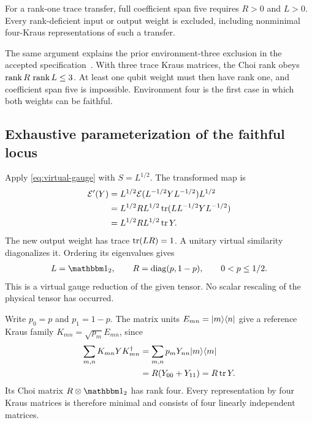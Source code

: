 \begin{proposition}
	\label{prop:faithful}
	For a rank-one trace transfer, full coefficient span five requires
	$R>0$ and $L>0$. Every rank-deficient input or output weight is
	excluded, including nonminimal four-Kraus representations of such
	a transfer.
\end{proposition}

The same argument explains the prior environment-three exclusion
in the accepted specification~\cite{Targets}. With three trace
Kraus matrices, the Choi rank obeys
$\operatorname{rank} R\,\operatorname{rank} L\leq3$. At least one qubit weight must then have
rank one, and coefficient span five is impossible. Environment four
is the first case in which both weights can be faithful.

\subsection{Exhaustive parameterization of the faithful locus}

Apply \cref{eq:virtual-gauge} with $S=L^{1/2}$. The transformed map is
\begin{align}
	\mathcal{E}'(Y)
	 & =L^{1/2}\mathcal{E}(L^{-1/2}YL^{-1/2})L^{1/2}
	\nonumber                                  \\
	 & =L^{1/2}RL^{1/2}
	\operatorname{tr}(LL^{-1/2}YL^{-1/2})
	\nonumber                                  \\
	 & =L^{1/2}RL^{1/2}\operatorname{tr} Y.
	\label{eq:whitening}
\end{align}
The new output weight has trace $\operatorname{tr}(LR)=1$. A unitary virtual
similarity diagonalizes it. Ordering its eigenvalues gives
\begin{align}
	L=\Id_2,\qquad
	R=\diag(p,1-p),\qquad
	0<p\leq1/2.
	\label{eq:normal-form}
\end{align}
This is a virtual gauge reduction of the given tensor. No scalar
rescaling of the physical tensor has occurred.

Write $p_0=p$ and $p_1=1-p$. The matrix units
$E_{mn}=\lvert m\rangle\langle n\rvert$ give a reference Kraus family
$K_{mn}=\sqrt{p_m}E_{mn}$, since
\begin{align}
	\sum_{m,n}K_{mn}YK_{mn}^\dagger
	 & =\sum_{m,n}p_mY_{nn}\lvert m\rangle\langle m\rvert
	\nonumber                           \\
	 & =R(Y_{00}+Y_{11})=R\operatorname{tr} Y.
	\label{eq:reference-kraus}
\end{align}
Its Choi matrix $R\otimes\Id_2$ has rank four. Every representation
by four Kraus matrices is therefore minimal and consists of four
linearly independent matrices.

